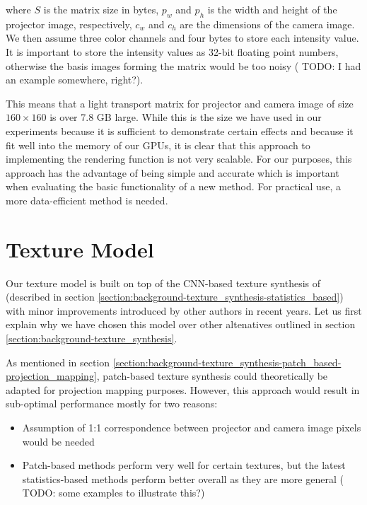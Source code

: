 where \(S\) is the matrix size in bytes, \(p_w\) and \(p_h\) is the width and height of the projector image, respectively, \(c_w\) and \(c_h\) are the dimensions of the camera image. We then assume three color channels and four bytes to store each intensity value. It is important to store the intensity values as 32-bit floating point numbers, otherwise the basis images forming the matrix would be too noisy ({\color{red} TODO: I had an example somewhere, right?}).

This means that a light transport matrix for projector and camera image of size \(160 \times 160\) is over 7.8 GB large. While this is the size we have used in our experiments because it is sufficient to demonstrate certain effects and because it fit well into the memory of our GPUs, it is clear that this approach to implementing the rendering function is not very scalable. For our purposes, this approach has the advantage of being simple and accurate which is important when evaluating the basic functionality of a new method. For practical use, a more data-efficient method is needed.

\section{Texture Model}
\label{section:methods-texture_model}

Our texture model is built on top of the CNN-based texture synthesis of \citet{Gatys2015} (described in section \ref{section:background-texture_synthesis-statistics_based}) with minor improvements introduced by other authors in recent years. Let us first explain why we have chosen this model over other altenatives outlined in section \ref{section:background-texture_synthesis}.

As mentioned in section \ref{section:background-texture_synthesis-patch_based-projection_mapping}, patch-based texture synthesis could theoretically be adapted for projection mapping purposes. However, this approach would result in sub-optimal performance mostly for two reasons:

\begin{itemize}
    \item Assumption of 1:1 correspondence between projector and camera image pixels would be needed
    \item Patch-based methods perform very well for certain textures, but the latest statistics-based methods perform better overall as they are more general ({\color{red} TODO: some examples to illustrate this?})
\end{itemize}

